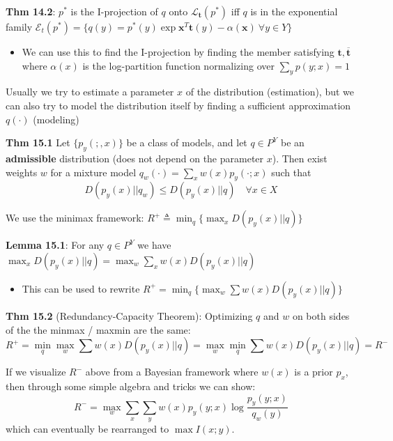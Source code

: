\documentclass[12pt]{article} %
\begin{document}
\textbf{Thm 14.2}: $p^*$ is the I-projection of $q$ onto $\mathcal{L}_{\mathbf{t}}(p^*)$ iff $q$ is in the exponential family $\mathcal{E}_t(p^*) = \{q(y) = p^*(y) \exp{\mathbf{x}^T\mathbf{t}(y) - \alpha(\mathbf{x})}\ \forall y \in Y\}$
\begin{itemize}[topsep=-1pt, itemsep=-1pt]
    \item We can use this to find the I-projection by finding the member satisfying $\mathbf{t}, \overline{\mathbf{t}}$ where $\alpha(x)$ is the log-partition function normalizing over $\sum_y p(y;x) = 1$
\end{itemize}


\newpage
{}
Usually we try to estimate a parameter $x$ of the distribution (estimation), but we can also try to model the distribution itself by finding a sufficient approximation $q(\cdot)$ (modeling)


\textbf{Thm 15.1} Let $\{p_y(;,x)\}$ be a class of models, and let $q \in P^Y$ be an \textbf{admissible} distribution (does not depend on the parameter $x$). Then exist weights $w$ for a mixture model $q_w(\cdot) = \sum_x w(x) p_y(\cdot;x)$ such that
\begin{equation*}
    D(p_y(x)||q_w) \leq D(p_y(x)||q) \quad \forall x \in X
\end{equation*}


We use the minimax framework: $R^+ \triangleq \min_q \{ \max_x D(p_y(x) || q) \}$

\textbf{Lemma 15.1}: For any $q \in P^Y$ we have $\max_x D(p_y(x)||q) = \max_w \sum_x w(x) D(p_y(x) ||q)$
\begin{itemize}[topsep=-1pt, itemsep=-1pt]
    \item This can be used to rewrite  $R^+ = \min_q \{ \max_w \sum w(x) D(p_y(x) || q) \}$
\end{itemize}


\textbf{Thm 15.2} (Redundancy-Capacity Theorem): Optimizing $q$ and $w$ on both sides of the the minmax / maxmin are the same:
\begin{equation*}
    R^+ = \min_q \max_w \sum w(x) D(p_y(x) || q)
    =
    \max_w  \min_q \sum w(x) D(p_y(x) || q) 
    = R^-
\end{equation*}

\separate
If we visualize $R^-$ above from a Bayesian framework where $w(x)$ is a prior $p_x$, then through some simple algebra and tricks we can show:
\begin{equation*}
    R^- = \max_w \sum_x \sum_y w(x) p_y(y;x) \log \frac{p_y(y;x)}{q_w(y)}
\end{equation*}
which can eventually be rearranged to $\max I(x;y)$.
\end{document}
